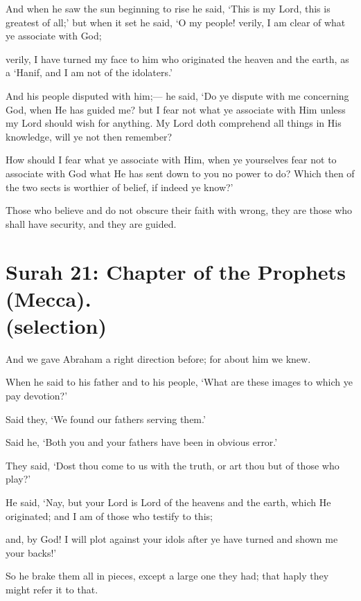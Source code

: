 \documentclass[fontsize=14pt, letterpaper, notitlepage, openany, DIV=12]{scrbook} %
\begin{document}
\noindent[6:78]
And when he saw the sun beginning to rise he said, `This is my Lord, this is greatest of
all;' but when it set he said, `O my people! verily, I am clear of what ye associate with God;

\noindent[6:79]
verily, I have turned my face to him who originated the heaven and the earth, as a `Hanif,
and I am not of the idolaters.'

\noindent[6:80]
And his people disputed with him;--- he said, `Do ye dispute with me concerning God,
when He has guided me? but I fear not what ye associate with Him unless my Lord should wish
for anything. My Lord doth comprehend all things in His knowledge, will ye not then remember?

\noindent[6:81]
How should I fear what ye associate with Him, when ye yourselves fear not to associate
with God what He has sent down to you no power to do? Which then of the two sects is worthier
of belief, if indeed ye know?'

\noindent[6:82]
Those who believe and do not obscure their faith with wrong, they are those who shall
have security, and they are guided.


\section[Surah 21: Chapter of the Prophets (Mecca).]{Surah 21: Chapter of the Prophets (Mecca).\\ (selection)}


\noindent[21:51]
And we gave Abraham a right direction before; for about him we knew.

\noindent[21:52]
When he said to his father and to his people, `What are these images to which ye pay
devotion?'

\noindent[21:53]
Said they, `We found our fathers serving them.'

\noindent[21:54]
Said he, `Both you and your fathers have been in obvious error.'

\noindent[21:55]
They said, `Dost thou come to us with the truth, or art thou but of those who play?'

\noindent[21:56]
He said, `Nay, but your Lord is Lord of the heavens and the earth, which He originated;
and I am of those who testify to this;

\noindent[21:57]
and, by God! I will plot against your idols after ye have turned and shown me your
backs!'

\noindent[21:58]
So he brake them all in pieces, except a large one they had; that haply they might refer it
to that.
\end{document}

